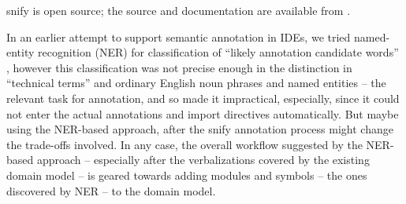 \documentclass{llncs}
\newcommand\snify{\textsf{snify}\xspace}
\begin{document}
\snify is open source; the source and documentation are available from
\cite{stextools:git}.

In an earlier attempt to support semantic annotation in IDEs, we tried named-entity
recognition (NER) for classification of ``likely annotation candidate words''
\cite{hutterer:msc23}, however this classification was not precise enough in the
distinction in ``technical terms'' and ordinary English noun phrases and named entities --
the relevant task for annotation, and so made it impractical, especially, since it could
not enter the actual annotations and import directives automatically. But maybe using the
NER-based approach, after the \snify annotation process might change the trade-offs
involved. In any case, the overall workflow suggested by the NER-based approach --
especially after the verbalizations covered by the existing domain model -- is geared towards adding modules and symbols -- the ones discovered by NER
-- to the domain model. 

\printbibliography
\end{document}
